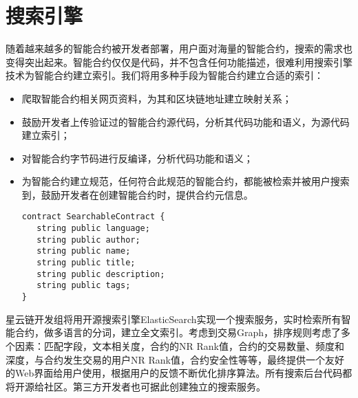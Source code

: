 \section{搜索引擎}
随着越来越多的智能合约被开发者部署，用户面对海量的智能合约，搜索的需求也变得突出起来。智能合约仅仅是代码，并不包含任何功能描述，很难利用搜索引擎技术为智能合约建立索引。我们将用多种手段为智能合约建立合适的索引：
\begin{itemize}
	\item 爬取智能合约相关网页资料，为其和区块链地址建立映射关系；
	\item 鼓励开发者上传验证过的智能合约源代码，分析其代码功能和语义，为源代码建立索引；
	\item 对智能合约字节码进行反编译，分析代码功能和语义；
	\item 为智能合约建立规范，任何符合此规范的智能合约，都能被检索并被用户搜索到，鼓励开发者在创建智能合约时，提供合约元信息。
	\begin{lstlisting}[frame=single]
contract SearchableContract {
   string public language;
   string public author;
   string public name;
   string public title;
   string public description;
   string public tags;
}
	\end{lstlisting}
\end{itemize}

星云链开发组将用开源搜索引擎ElasticSearch实现一个搜索服务，实时检索所有智能合约，做多语言的分词，建立全文索引。考虑到交易Graph，排序规则考虑了多个因素：匹配字段，文本相关度，合约的NR Rank值，合约的交易数量、频度和深度，与合约发生交易的用户NR Rank值，合约安全性等等，最终提供一个友好的Web界面给用户使用，根据用户的反馈不断优化排序算法。所有搜索后台代码都将开源给社区。第三方开发者也可据此创建独立的搜索服务。